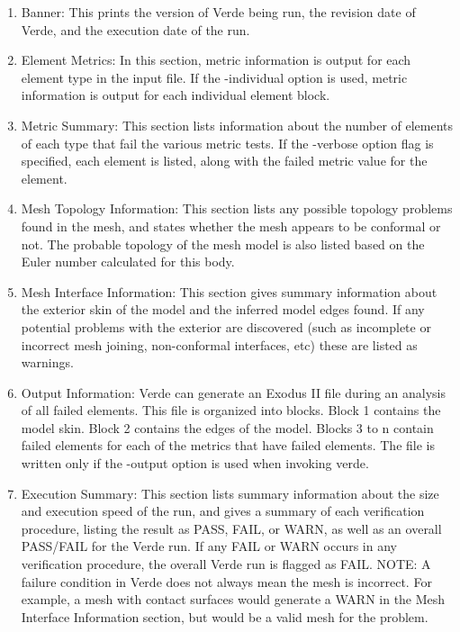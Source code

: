 \documentclass[10pt]{report}
\begin{document}
\begin{enumerate}


\item
{
Banner:  This prints the version of Verde being run, the revision date 
of Verde, and the execution date of the run.
}
\item
{
Element Metrics: In this section, metric information is output for each 
element type in the input file. If the -individual option is used, 
metric information is output for each individual element block.
}
\item
{
Metric Summary:  This section lists information about the number of 
elements of each type that fail the various metric tests.  If the 
-verbose option flag is specified, each element is listed, along with 
the failed metric value for the element.
}
\item
{
Mesh Topology Information:  This section lists any possible topology 
problems found in the mesh, and states whether the mesh appears to be 
conformal or not.  The probable topology of the mesh model is also 
listed based on the Euler number calculated for this body.
}
\item
{
Mesh Interface Information:  This section gives summary information 
about the exterior skin of the model and the inferred model edges 
found.  If any potential problems with the exterior are discovered 
(such as incomplete or incorrect mesh joining, non-conformal 
interfaces, etc) these are listed as warnings.
}
\item
{
Output Information:  Verde can generate an Exodus II file during an 
analysis of all failed elements.  This file is organized into blocks.
Block 1 contains the model skin. Block 2 contains the edges of the 
model.  Blocks 3 to n contain failed elements for each of the 
metrics that have failed elements. The file is written only if 
the -output option is used when invoking verde.
}
\item
{
Execution Summary:  This section lists summary information about the 
size and execution speed of the run, and gives a summary of each 
verification procedure, listing the result as PASS, FAIL, or WARN, as 
well as an overall PASS/FAIL for the Verde run.  If any FAIL or WARN 
occurs in any verification procedure, the overall Verde run is flagged 
as FAIL.  NOTE: A failure condition in Verde does not always mean the 
mesh is incorrect.  For example, a mesh with contact surfaces would 
generate a WARN in the Mesh Interface Information section, but would be 
a valid mesh for the problem.
}
\end{enumerate}
\end{document}

